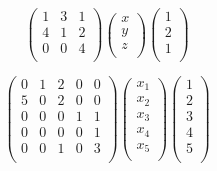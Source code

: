 \documentclass[12pt]{article}
\begin{document}
  
\begin{equation}
    \begin{pmatrix}
        1       &   3       &   1   \\
        4       &   1       &   2   \\
        0       &   0       &   4   \\
    \end{pmatrix}
    \begin{pmatrix}
        x       \\
        y       \\
        z       \\
    \end{pmatrix}
    \begin{pmatrix}
        1       \\
        2       \\
        1       \\
    \end{pmatrix}
\end{equation}

\begin{equation}
    \begin{pmatrix}
        0       &   1       &   2   &   0   &   0   \\
        5       &   0       &   2   &   0   &   0   \\
        0       &   0       &   0   &   1   &   1   \\
        0       &   0       &   0   &   0   &   1   \\
        0       &   0       &   1   &   0   &   3   \\
    \end{pmatrix}
    \begin{pmatrix}
        x_{1}   \\
        x_{2}   \\
        x_{3}   \\
        x_{4}   \\
        x_{5}   \\
    \end{pmatrix}
    \begin{pmatrix}
        1       \\
        2       \\
        3       \\
        4       \\
        5       \\
    \end{pmatrix}
\end{equation}
\newpage
\end{document}
